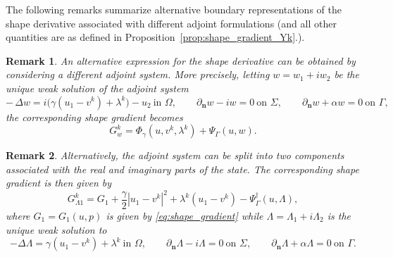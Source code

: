 \documentclass[a4paper,11pt]{article}
\newtheorem{remark}{Remark}
\newcommand{\vect}[1]{\boldsymbol{\mathbf{#1}}}
\newcommand{\tannabla}{\nabla_{\varGamma}}
\newcommand{\ur}{u_{1}}
\newcommand{\ui}{u_{2}}
\newcommand{\rw}{w_{1}}
\newcommand{\iw}{w_{2}}
\newcommand{\rlam}{\Lambda_{1}}
\newcommand{\ilam}{\Lambda_{2}}
\newcommand{\GG}{G} %
\newcommand{\nn}{\vect{n}}
\newcommand{\dn}[1]{\partial_{\nn}{#1}}
\newcommand{\ADMMpara}{\gamma}
\begin{document}
The following remarks summarize alternative boundary representations of the shape derivative associated with different adjoint formulations (and all other quantities are as defined in Proposition~\ref{prop:shape_gradient_Yk}.).
%
%
\begin{remark}\label{rem:shape_gradient_Yk_alt}
An alternative expression for the shape derivative can be obtained by considering a different adjoint system. 
More precisely, letting $w = \rw + i \iw$ be the unique weak solution of the adjoint system
\begin{equation}\label{eq:adjoint_ADMM_choice}
-\,\Delta w
=
i\big(\ADMMpara(\ur - v^{k}) + \lambda^{k}\big) - \ui
\ \text{in } \varOmega, \qquad
\dn w - i w = 0 \ \text{on } \varSigma, \qquad
\dn w + \alpha w = 0 \ \text{on } \varGamma,
\end{equation}
the corresponding shape gradient becomes
\begin{equation}\label{eq:shape_gradient_Yk}
\GG^{k}_w
=
\Phi_{\ADMMpara}(u, v^{k}, \lambda^{k})
+
\Psi_{\varGamma}(u, w).
\end{equation} 




\end{remark}
%
%
%
%
\begin{remark}\label{prop:shape_gradient_Yk_crossed}
Alternatively, the adjoint system can be split into two components associated with the real and imaginary parts of the state.
The corresponding shape gradient is then given by
\begin{equation}\label{eq:shape_gradient_Yk_split}
\GG^{k}_{\Lambda1}
=
\GG_{1}
+
\frac{\ADMMpara}{2}|\ur-v^{k}|^2
+
\lambda^{k}(\ur-v^{k})
-
\Psi^{\dagger}_{\varGamma}(u, \Lambda),
\end{equation}
where $\GG_{1} = \GG_{1}(u, p)$ is given by \eqref{eq:shape_gradient} while $\Lambda=\rlam+i \ilam$ is the unique weak solution to 
\begin{equation}
\label{eq:adjoint_Lambda_crossed}
-\Delta \Lambda
=
\ADMMpara(\ur-v^{k})+\lambda^{k}
\ \text{in } \varOmega,
\qquad
\dn \Lambda - i \Lambda = 0 \ \text{on } \varSigma,
\qquad
\dn \Lambda + \alpha \Lambda = 0 \ \text{on } \varGamma.
\end{equation}
\end{remark}
\end{document}
